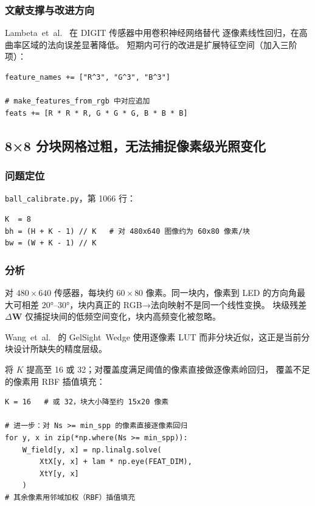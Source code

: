 \documentclass[12pt, a4paper]{ctexart}
\begin{document}
\subsubsection*{文献支撑与改进方向}

Lambeta~et~al.~\cite{lambeta2020digit} 在 DIGIT 传感器中用卷积神经网络替代
逐像素线性回归，在高曲率区域的法向误差显著降低。
短期内可行的改进是扩展特征空间（加入三阶项）：

\begin{lstlisting}[caption={短期改进：在特征中加入三阶单项式}]
feature_names += ["R^3", "G^3", "B^3"]

# make_features_from_rgb 中对应追加
feats += [R * R * R, G * G * G, B * B * B]
\end{lstlisting}

\subsection{8×8 分块网格过粗，无法捕捉像素级光照变化}
\label{subsec:block_grid}

\subsubsection*{问题定位}

\texttt{ball\_calibrate.py}，第 1066 行：

\begin{lstlisting}[caption={硬编码的 8×8 分块}]
K  = 8
bh = (H + K - 1) // K   # 对 480x640 图像约为 60x80 像素/块
bw = (W + K - 1) // K
\end{lstlisting}

\subsubsection*{分析}

对 $480 \times 640$ 传感器，每块约 $60 \times 80$ 像素。同一块内，像素到 LED
的方向角最大可相差 $20°$--$30°$，块内真正的 RGB→法向映射不是同一个线性变换。
块级残差 $\Delta\mathbf{W}$ 仅捕捉块间的低频空间变化，块内高频变化被忽略。

Wang~et~al.~\cite{wang2021gelsightwedge} 的 GelSight~Wedge 使用逐像素 LUT
而非分块近似，这正是当前分块设计所缺失的精度层级。

\begin{fixbox}
将 $K$ 提高至 16 或 32；对覆盖度满足阈值的像素直接做逐像素岭回归，
覆盖不足的像素用 RBF 插值填充：

\begin{lstlisting}
K = 16   # 或 32，块大小降至约 15x20 像素

# 进一步：对 Ns >= min_spp 的像素直接逐像素回归
for y, x in zip(*np.where(Ns >= min_spp)):
    W_field[y, x] = np.linalg.solve(
        XtX[y, x] + lam * np.eye(FEAT_DIM),
        XtY[y, x]
    )
# 其余像素用邻域加权（RBF）插值填充
\end{lstlisting}
\end{fixbox}
\end{document}
